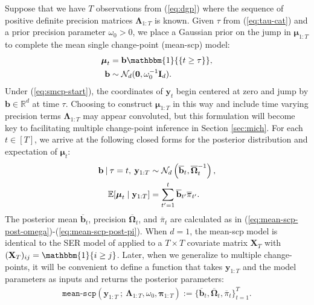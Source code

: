 Suppose that we have $T$ observations from (\ref{eq:dgp}) where the sequence of positive definite precision matrices $\boldsymbol{\Lambda}_{1:T}$ is known. Given $\tau$ from (\ref{eq:tau-cat}) and a prior precision parameter $\omega_0 > 0$, we place a Gaussian prior on the jump in $\boldsymbol{\mu}_{1:T}$ to complete the mean single change-point (mean-scp) model:
\begin{align} \label{eq:smcp-start}
    \boldsymbol{\mu}_t &= \mathbf{b}\mathbbm{1}{\left\{t\geq \tau \right\}}, \\
    \mathbf{b} &\sim \mathcal{N}_d(\mathbf{0},\omega_0^{-1} \mathbf{I}_d). \label{eq:smcp-end}
\end{align}
Under (\ref{eq:smcp-start}), the coordinates of $\mathbf{y}_{t}$ begin centered at zero and jump by $\mathbf{b}\in\mathbb{R}^d$ at time $\tau$. Choosing to construct $\boldsymbol{\mu}_{1:T}$ in this way and include time varying precision terms $\boldsymbol{\Lambda}_{1:T}$ may appear convoluted, but this formulation will become key to facilitating multiple change-point inference in Section \ref{sec:mich}. For each $t \in [T]$, we arrive at the following closed forms for the posterior distribution and expectation of $\boldsymbol{\mu}_t$:
\begin{align}
    \mathbf{b} \:|\: \tau = t, \: \mathbf{y}_{1:T} &\sim \mathcal{N}_d\left(\overline{\mathbf{b}}_{t}, \overline{\boldsymbol{\Omega}}_{t}^{-1}\right), \label{eq:b-smcp} \\ 
    \mathbb{E}[\boldsymbol{\mu}_{t} \;|\; \mathbf{y}_{1:T}] &= \sum_{t'=1}^t \overline{\mathbf{b}}_{t'} \overline{\pi}_{t'}. \label{eq:mu-post-mean}
\end{align}
The posterior mean $\overline{\mathbf{b}}_{t}$, precision $\overline{\boldsymbol{\Omega}}_{t}$, and $\overline{\pi}_t$ are calculated as in (\ref{eq:mean-scp-post-omega})-(\ref{eq:mean-scp-post-pi}). When $d = 1$, the mean-scp model is identical to the SER model of \cite{Wang20} applied to a $T\times T$ covariate matrix $\mathbf{X}_T$ with $(\mathbf{X}_T)_{ij} = \mathbbm{1} \{i \geq j\}$. Later, when we generalize to multiple change-points, it will be convenient to define a function that takes $\mathbf{y}_{1:T}$ and the model parameters as inputs and returns the posterior parameters: 
\begin{align}\label{eq:mean-scp-fn}
    \texttt{mean-scp}\left(\mathbf{y}_{1:T} \:;\: \boldsymbol{\Lambda}_{1:T}, \omega_0, \boldsymbol{\pi}_{1:T}\right) := \{\overline{\mathbf{b}}_t, \overline{\boldsymbol{\Omega}}_t, \overline{\pi}_t\}_{t=1}^T.
\end{align}

